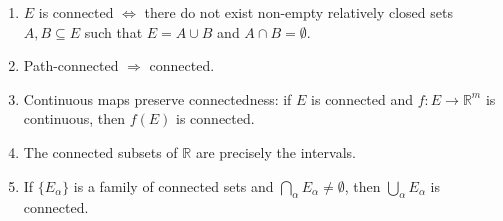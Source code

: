 \begin{proposition}\label{prop:connected_properties}
\begin{enumerate}[label=(\roman*)]
    \item $E$ is connected $\iff$ there do not exist non-empty relatively closed sets $A, B \subseteq E$ such that $E = A \cup B$ and $A \cap B = \emptyset$.
    \item Path-connected $\Rightarrow$ connected.
    \item Continuous maps preserve connectedness: if $E$ is connected and $f: E \to \mathbb{R}^m$ is continuous, then $f(E)$ is connected.
    \item The connected subsets of $\mathbb{R}$ are precisely the intervals.
    \item If $\{E_\alpha\}$ is a family of connected sets and $\bigcap_\alpha E_\alpha \neq \emptyset$, then $\bigcup_\alpha E_\alpha$ is connected.
\end{enumerate}
\end{proposition}

